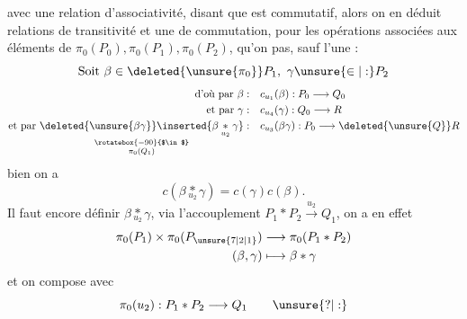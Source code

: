 avec une relation d'associativité, disant que
est commutatif, alors on en déduit   relations de transitivité et une de commutation, pour les opérations associées aux éléments de $\pi_0(P_0),\pi_0(P_1),\pi_0(P_2)$, qu'on  pas, sauf l'une :
\[
\text{Soit }\beta\in\deleted{\unsure{\pi_0}}P_1,\ \gamma\unsure{\in|:}P_2
\]
\[
\begin{aligned}
\text{d'où par }\beta:\quad &c_{u_1}(\beta):P_0\longrightarrow Q_0\\
\text{et par }\gamma:\quad &c_{u_4}(\gamma):Q_0\longrightarrow R\\
\text{et par }\underset{\substack{\rotatebox{-90}{$\in$}\\\pi_0(Q_1)}}{\deleted{\unsure{\beta\gamma}}\inserted{\beta\underset{u_2}{*}\gamma}}:\quad &c_{u_3}(\beta\gamma):P_0\longrightarrow\deleted{\unsure{Q}}R
\end{aligned}
\]
 bien on a
\[
\boxed{c(\beta\underset{u_2}{*}\gamma)=c(\gamma)c(\beta)}.
\]
Il faut encore définir $\beta\underset{u_2}{*}\gamma$, via l'accouplement $P_1*P_2\xrightarrow{u_2}Q_1$, on a en effet
\[
\begin{aligned}
\pi_0(P_1)\times\pi_0(P_{\unsure{7|2|1}})&\longrightarrow\pi_0(P_1*P_2)\\
(\beta,\gamma)&\longmapsto\beta*\gamma
\end{aligned}
\]
et on compose avec
\[
\pi_0(u_2):P_1*P_2\longrightarrow Q_1\qquad\unsure{?|:}
\]

